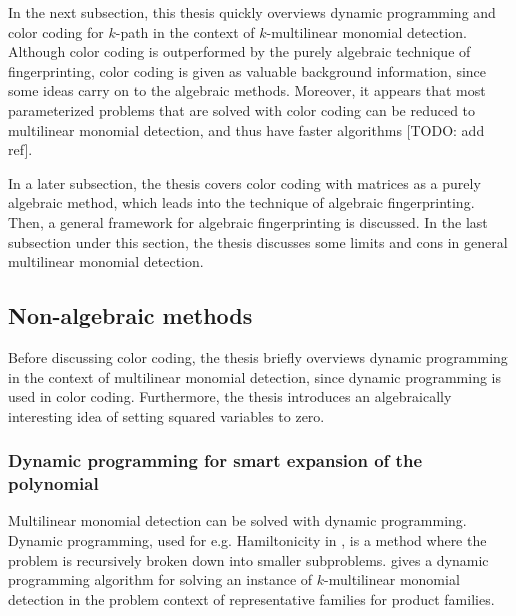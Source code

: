 In the next subsection, this thesis quickly overviews dynamic programming and 
color coding for $k$-path in the context of 
$k$-multilinear monomial detection. Although color coding is outperformed by the 
purely algebraic technique of fingerprinting, color coding is given as valuable background information, 
since some ideas carry on to the algebraic methods. Moreover, 
it appears that most parameterized problems that are solved with color coding can be reduced to 
multilinear monomial detection, and thus have faster algorithms [TODO: add ref].\nl 

In a later subsection, 
the thesis covers color coding with matrices as a purely algebraic method, which leads into 
the technique of algebraic fingerprinting. Then, a general framework for algebraic fingerprinting is discussed. 
In the last subsection under this section, 
the thesis discusses some limits and cons in general multilinear monomial detection.


\subsection{Non-algebraic methods}

Before discussing color coding, the thesis briefly overviews dynamic programming in the context of 
multilinear monomial detection, since dynamic programming is used in color coding. Furthermore, 
the thesis introduces an algebraically interesting idea of setting squared variables to zero.

\subsubsection{Dynamic programming for smart expansion of the polynomial}

Multilinear monomial detection can be solved with dynamic programming. 
Dynamic programming, used for e.g. Hamiltonicity in \cite{HelKar62}, is a method where the problem 
is recursively broken down into smaller subproblems. \cite{Fomin17} gives a dynamic programming algorithm 
for solving an instance of $k$-multilinear monomial detection in the problem context of 
representative families for product families.\nl

